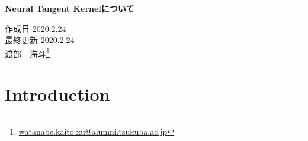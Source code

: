 \documentclass[a4paper]{bxjsarticle}
\makeatletter
\newcommand{\mytitle}{Neural Tangent Kernelについて}
\newcommand{\myhead}{
\begin{center}%
\textbf{\LARGE\mytitle}%
\end{center}%
\vspace{0.7em}
\begin{flushright}%
作成日 2020.2.24\\%
最終更新 2020.2.24\\%
渡部　海斗\footnote{\protect\url{watanabe.kaito.xu@alumni.tsukuba.ac.jp}}%
\end{flushright}}
\theoremstyle{definition}
\makeatother
\begin{document}
\myhead

\section{Introduction}
\end{document}
